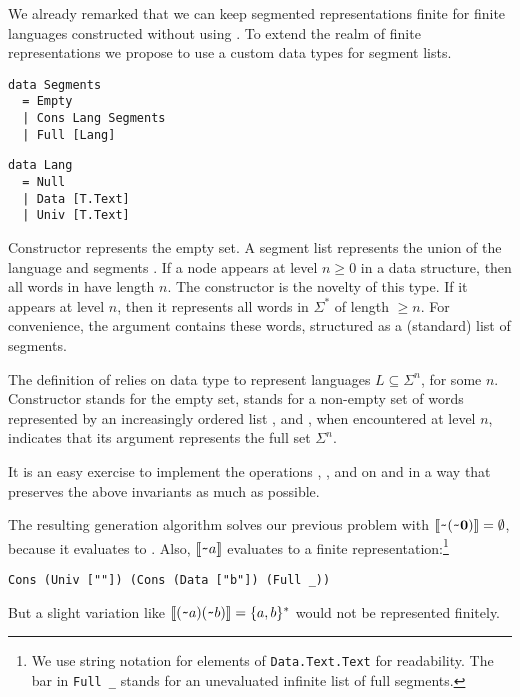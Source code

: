 We already remarked that we can keep segmented representations finite
for finite languages constructed without using .  To
extend the realm of finite representations we propose to use a custom
data types for segment lists.
\begin{center}
  \vspace{-\baselineskip}
  \begin{minipage}[t]{0.49\linewidth}
\begin{lstlisting}
data Segments
  = Empty
  | Cons Lang Segments
  | Full [Lang]
\end{lstlisting}
  \end{minipage}
  \qquad
  \begin{minipage}[t]{0.4\linewidth}
\begin{lstlisting}
data Lang
  = Null
  | Data [T.Text]
  | Univ [T.Text]
\end{lstlisting}
  \end{minipage}
\end{center}
Constructor  represents the empty set. A segment list
 represents the union of the language
 and segments . If a  node
appears at level $n\ge0$ in a  data structure, then all
words in  have length $n$. The constructor  is
the novelty of this type. If it appears at level $n$, then it
represents all words in $\Sigma^*$ of length $\ge n$. For convenience,
the argument  contains these words, structured as a
(standard) list of segments.

The definition of  relies on data type  to
represent languages $L\subseteq \Sigma^n$,  for some $n$.
Constructor  stands for the empty set, 
stands for a non-empty set of words represented by an increasingly
ordered list , and , when encountered at level
$n$, indicates that its argument  represents the full set $\Sigma^n$.

It is an easy exercise to implement the operations
, , and  on 
and  in a way that preserves the above invariants as
much as possible.

The resulting generation algorithm solves our previous problem 
with $\llbracket\texttt{\textasciitilde}{(\texttt{\textasciitilde}{\mathbf0})}\rrbracket = \emptyset$,
because it evaluates to . Also, $\llbracket\texttt{\textasciitilde}{a}\rrbracket$
evaluates to a finite representation:\footnote{We use string notation
  for elements of \lstinline{Data.Text.Text} for readability. The bar in \lstinline{Full _} stands for an unevaluated infinite list of full segments.}
\begin{lstlisting}[numbers=none]
Cons (Univ [""]) (Cons (Data ["b"]) (Full _))
\end{lstlisting}
But a slight variation like
$\llbracket(\texttt{\textasciitilde}{a})(\texttt{\textasciitilde}{b})\rrbracket = \{a,b\}^*$ would not be
represented finitely.

